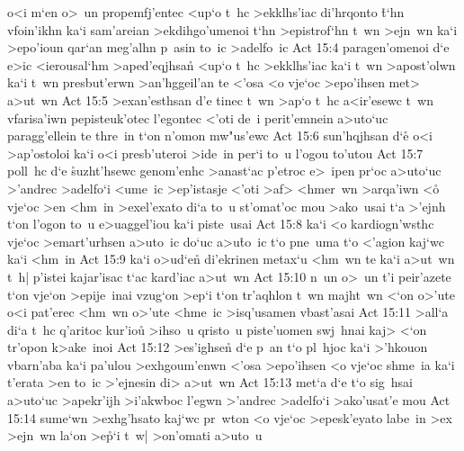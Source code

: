 o<i
m`en
o>~un
propemfj'entec
<up`o
t~hc
>ekklhs'iac
di'hrqonto
\r{t}`hn
vfoin'ikhn
ka`i
sam'areian
>ekdihgo'umenoi
t`hn
>epistrof`hn
t~wn
>ejn~wn
ka`i
>epo'ioun
qar`an
meg'alhn
p~asin
to~ic
>adelfo~ic\bibvsend
\vs Act 15:4
paragen'omenoi
d`e
e>ic
<ierousal`hm
>aped'eqjhsan\r{}
<up`o
t~hc
>ekklhs'iac
ka`i
t~wn
>apost'olwn
ka`i
t~wn
presbut'erwn
>an'hggeil'an
te
<'osa
<o
vje`oc
>epo'ihsen
met>
a>ut~wn\bibvsend
\vs Act 15:5
>exan'esthsan
d'e
tinec
t~wn
>ap`o
t~hc
a<ir'esewc
t~wn
vfarisa'iwn
pepisteuk'otec
l'egontec
<'oti
de~i
perit'emnein
a>uto`uc
paragg'ellein
te
thre~in
t`on
n'omon
mw"us'ewc\bibvsend
\vs Act 15:6
sun'hqjhsan
d`e\r{}
o<i
>ap'ostoloi
ka`i
o<i
presb'uteroi
>ide~in
per`i
to~u
l'ogou
to'utou\bibvsend
\vs Act 15:7
poll~hc
d`e
\r{s}uzht'hsewc
genom'enhc
>anast`ac
p'etroc
e>~ipen
pr`oc
a>uto`uc
>'andrec
>adelfo`i
<ume~ic
>ep'istasje
<'oti
>af>
<hmer~wn
>arqa'iwn
<o\r{}
vje`oc
>en
<hm~in
>exel'exato
di`a
to~u
st'omat'oc
mou
>ako~usai
t`a
>'ejnh
t`on
l'ogon
to~u
e>uaggel'iou
ka`i
piste~usai\bibvsend
\vs Act 15:8
ka`i
<o
kardiogn'wsthc
vje`oc
>emart'urhsen
a>uto~ic
do`uc
a>u\r{t}o~ic
t`o
pne~uma
t`o
<'agion
kaj`wc
ka`i
<hm~in\bibvsend
\vs Act 15:9
ka`i
o>ud`e\r{n}
di'ekrinen
metax`u
<hm~wn
te
ka`i
a>ut~wn
t~h|
p'istei
kajar'isac
t`ac
kard'iac
a>ut~wn\bibvsend
\vs Act 15:10
n~un
o>~un
t'i
peir'azete
t`on
vje`on
>epije~inai
vzug`on
>ep`i
t`on
tr'aqhlon
t~wn
majht~wn
<`on
o>'ute
o<i
pat'erec
<hm~wn
o>'ute
<hme~ic
>isq'usamen
vbast'asai\bibvsend
\vs Act 15:11
>all`a
di`a
t~hc
q'aritoc
kur'iou\r{}
>ihso~u
qristo~u
piste'uomen
swj~hnai
kaj>
<`on
tr'opon
k>ake~inoi\bibvsend
\vs Act 15:12
>es'ighsen\r{}
d`e
p~an
t`o
pl~hjoc
ka`i
>'hkouon
vbarn'aba
ka`i
pa'ulou
>exhgoum'enwn
<'osa
>epo'ihsen
<o
vje`oc
shme~ia
ka`i
t'erata
>en
to~ic
>'ejnesin
di>
a>ut~wn\bibvsend
\vs Act 15:13
met`a
d`e
t`o
sig~hsai
a>uto`uc
>apekr'ijh
>i'akwboc
l'egwn
>'andrec
>adelfo`i
>ako'usat'e
mou\bibvsend
\vs Act 15:14
sume`wn
>exhg'hsato
kaj`wc
pr~wton
<o
vje`oc
>epesk'eyato
labe~in
>ex
>ejn~wn
la`on
>e\r{p}`i
t~w|
>on'omati
a>uto~u\bibvsend
